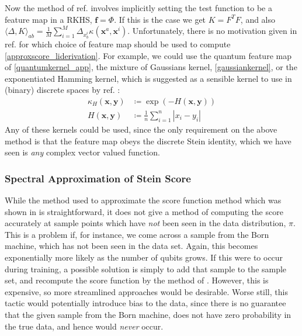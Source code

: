 \noindent Now the method of ref. involves implicitly setting the test function to be a feature map in a RKHS, $\mathbf{f} = \Phi$. If this is the case we get $K = F^TF$, and also $\langle \Delta, K\rangle_{ab} = \frac{1}{M}\sum_{i=1}^M \Delta_{x^i_b}\kappa(\mathbf{x}^a, \mathbf{x}^i)$. Unfortunately, there is no motivation given in ref. for which choice of feature map should be used to compute \eqref{approxscore_liderivation}. For example, we could use the quantum feature map  of \eqref{quantumkernel_app}, the mixture of Gaussians kernel, \eqref{gaussiankernel}, or the exponentiated Hamming kernel, which is suggested as a sensible kernel to use in (binary) discrete spaces by ref. :
\begin{align}
    \kappa_H(\mathbf{x}, \mathbf{y}) & \coloneqq \exp\left(-H(\mathbf{x}, \mathbf{y})\right)\\
    H(\mathbf{x}, \mathbf{y}) & \coloneqq \frac{1}{n} \sum\limits_{i=1}^n|x_i - y_i| \label{hammingkernel}
\end{align}
Any of these kernels could be used, since the only requirement on the above method is that the feature map obeys the discrete Stein identity, which we have seen is \textit{any} complex vector valued function.



\subsubsection{Spectral Approximation of Stein Score\label{supp_matt:spectralsteinscore}}


While the method used to approximate the score function method which was shown in  is straightforward, it does not give a method of computing the score accurately at sample points which have \textit{not} been seen in the data distribution, $\pi$. This is a problem if, for instance, we come across a sample from the Born machine, which has not been seen in the data set. Again, this becomes exponentially more likely as the number of qubits grows. If this were to occur during training, a possible solution is simply to add that sample to the sample set, and recompute the score function by the method of . However, this is expensive, so more streamlined approaches would be desirable. Worse still, this tactic would potentially introduce bias to the data, since there is no guarantee that the given sample from the Born machine, does not have zero probability in the true data, and hence would \textit{never} occur. 

